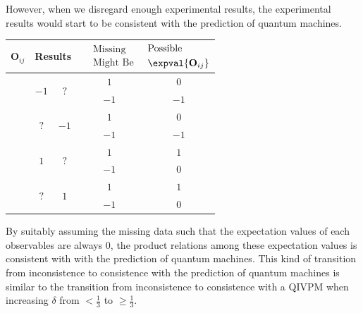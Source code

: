 \documentclass[english,reprint, aps, prl,superscriptaddress, showpacs,
showkeys, longbibliography, amsmath, amssymb, floatfix]{revtex4-1}
\theoremstyle{plain}
\theoremstyle{definition}
\newcommand{\missing}{?}
\begin{document}
\noindent However, when we disregard enough experimental results, the
experimental results would start to be consistent with the prediction
of quantum machines.
\begin{center}
\begin{tabular}{ccccc}
\toprule 
\addlinespace
$\mathbf{O}_{ij}$  & \multicolumn{2}{c}{Results} & $\begin{aligned} & \textrm{Missing}\\
 & \textrm{Might Be}
\end{aligned}
$  & $\begin{aligned} & \textrm{Possible}\\
 & \expval{\mathbf{O}_{ij}}
\end{aligned}
$\tabularnewline
\midrule
\midrule 
\addlinespace
\multirow{2}{*}{$\mathbf{O}_{00}$, $\mathbf{O}_{11}$} & \multirow{2}{*}{$-1$ } & \multirow{2}{*}{$\missing$} & $1$ & $0$\tabularnewline
\cmidrule{4-5} 
\addlinespace
 &  &  & $-1$ & $-1$\tabularnewline
\midrule 
\addlinespace
\multirow{2}{*}{$\mathbf{O}_{01}$, $\mathbf{O}_{10}$} & \multirow{2}{*}{$\missing$} & \multirow{2}{*}{$-1$ } & $1$ & $0$\tabularnewline
\cmidrule{4-5} 
\addlinespace
 &  &  & $-1$ & $-1$\tabularnewline
\midrule 
\addlinespace
\multirow{2}{*}{$\mathbf{O}_{20}$, $\mathbf{O}_{21}$} & \multirow{2}{*}{$1$ } & \multirow{2}{*}{$\missing$} & $1$ & $1$\tabularnewline
\cmidrule{4-5} 
\addlinespace
 &  &  & $-1$ & $0$\tabularnewline
\midrule 
\addlinespace
\multirow{2}{*}{$\mathbf{O}_{02}$, $\mathbf{O}_{12}$, $\mathbf{O}_{22}$} & \multirow{2}{*}{$\missing$} & \multirow{2}{*}{$1$} & $1$ & $1$\tabularnewline
\cmidrule{4-5} 
\addlinespace
 &  &  & $-1$ & $0$\tabularnewline
\bottomrule
\end{tabular}
\par\end{center}

\noindent By suitably assuming the missing data such that the expectation
values of each observables are always $0$, the product relations
among these expectation values is consistent with with the prediction
of quantum machines. This kind of transition from inconsistence to
consistence with the prediction of quantum machines is similar to
the transition from inconsistence to consistence with a QIVPM when
increasing $\delta$ from $<\tfrac{1}{3}$ to $\ge\tfrac{1}{3}$.
\end{document}
